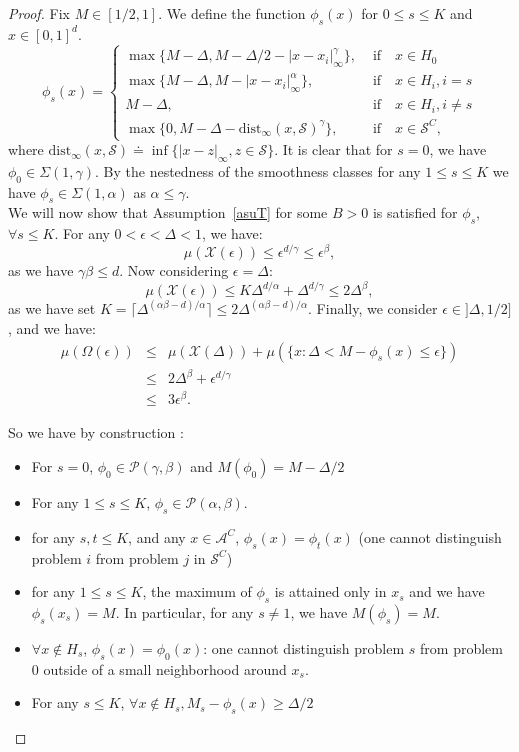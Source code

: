\documentclass[final,12pt]{colt2018}
\begin{document}
\begin{proof}
Fix $M \in [1/2,1]$. We define the function $\phi_{s}(x)$ for $0 \leq s \leq K$ and $x \in [0,1]^d$.
\begin{equation*}
\phi_{s}(x) = \begin{cases}
\max\{M-\Delta, M - \Delta/2-|x-x_i|_{\infty}^{\gamma}\}, &\text{~if~~~} x\in H_0\\
\max\{M-\Delta,M-|x-x_i|_{\infty}^{\alpha}\}, &\text{~if~~~} x\in H_i, i=s\\
M -\Delta, &\text{~if~~~} x\in H_i, i \neq s\\
\max\{0, M -\Delta - \text{dist}_{\infty}(x, \mathcal{S})^{\gamma}\}, &\text{~if~~~} x \in \mathcal{S}^C,
\end{cases}
\end{equation*}
where $\text{dist}_\infty(x, \mathcal{S}) \doteq \inf\{|x-z|_\infty, z \in \mathcal S\}$. It is clear that for $s=0$, we have $\phi_0 \in \Sigma(1, \gamma)$. By the nestedness of the smoothness classes for any $1 \leq s \leq K$ we have $\phi_s \in \Sigma(1, \alpha)$ as $\alpha \leq \gamma$. \\
We will now show that Assumption~\ref{asuT} for some $B >0$ is satisfied for $\phi_s$, $\forall s \leq K$. For any $0 <\epsilon < \Delta < 1$, we have:
$$
\mu(\mathcal X(\epsilon)) \leq \epsilon^{d/\gamma} \leq \epsilon^\beta,
$$
as we have $\gamma\beta \leq d$. Now considering $\epsilon = \Delta$:
$$
\mu(\mathcal X(\epsilon)) \leq K \Delta^{d/\alpha} + \Delta^{d/\gamma} \leq 2 \Delta^{\beta},
$$
as we have set $K = \lceil{\Delta^{(\alpha\beta-d)/\alpha}\rceil} \leq 2 \Delta^{(\alpha\beta-d)/\alpha}$. Finally, we consider $\epsilon \in ]\Delta, 1/2] $, and we have:
\begin{eqnarray*}
\mu(\Omega(\epsilon)) & \leq & \mu(\mathcal X(\Delta)) + \mu(\{x: \Delta < M- \phi_s(x) \leq \epsilon \})\\
& \leq & 2 \Delta^\beta + \epsilon^{d/\gamma}\\
& \leq & 3 \epsilon^\beta.
\end{eqnarray*}

So we have by construction :
\begin{itemize}
\item For $s = 0$, $\phi_0 \in \mathcal{P}(\gamma,\beta)$ and $M(\phi_0) = M - \Delta/2$ 
\item For any $1 \leq s \leq K$, $\phi_s \in \mathcal{P}(\alpha,\beta)$. 
\item for any $s,t \leq K$, and any $x \in \mathcal A^C$, $\phi_s(x) = \phi_t(x)$ (one cannot distinguish problem $i$ from problem $j$ in $\mathcal{S}^C$)
\item for any $1 \leq s \leq K$, the maximum of $\phi_s$ is attained only in $x_s$ and we have $\phi_s(x_s) = M$. In particular, for any $s \neq 1$, we have $M(\phi_s) = M$.
\item  $\forall x \not\in H_s$, $\phi_s(x) = \phi_0(x)$: one cannot distinguish problem $s$ from problem $0$ outside of a small neighborhood around $x_s$.
\item  For any $s \leq K$, $\forall x \not\in H_s, M_s - \phi_s(x) \geq \Delta/2$
\end{itemize}



\end{proof}
\end{document}
